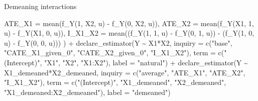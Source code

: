 \documentclass[
  11pt,
  ignorenonframetext,
]{beamer}
\newenvironment{Shaded}{\begin{snugshade}}{\end{snugshade}}
\newcommand{\AttributeTok}[1]{\textcolor[rgb]{0.40,0.45,0.13}{#1}}
\newcommand{\DecValTok}[1]{\textcolor[rgb]{0.68,0.00,0.00}{#1}}
\newcommand{\FunctionTok}[1]{\textcolor[rgb]{0.28,0.35,0.67}{#1}}
\newcommand{\NormalTok}[1]{\textcolor[rgb]{0.00,0.23,0.31}{#1}}
\newcommand{\SpecialCharTok}[1]{\textcolor[rgb]{0.37,0.37,0.37}{#1}}
\newcommand{\StringTok}[1]{\textcolor[rgb]{0.13,0.47,0.30}{#1}}
\begin{document}
\begin{frame}[fragile]{Demeaning interactions}
\begin{Shaded}
\begin{Highlighting}[]
    \AttributeTok{ATE\_X1 =} \FunctionTok{mean}\NormalTok{(}\FunctionTok{f\_Y}\NormalTok{(}\DecValTok{1}\NormalTok{, X2, u) }\SpecialCharTok{{-}} \FunctionTok{f\_Y}\NormalTok{(}\DecValTok{0}\NormalTok{, X2, u)),}
    \AttributeTok{ATE\_X2 =} \FunctionTok{mean}\NormalTok{(}\FunctionTok{f\_Y}\NormalTok{(X1, }\DecValTok{1}\NormalTok{, u) }\SpecialCharTok{{-}} \FunctionTok{f\_Y}\NormalTok{(X1, }\DecValTok{0}\NormalTok{, u)),}
    \AttributeTok{I\_X1\_X2 =} \FunctionTok{mean}\NormalTok{((}\FunctionTok{f\_Y}\NormalTok{(}\DecValTok{1}\NormalTok{, }\DecValTok{1}\NormalTok{, u) }\SpecialCharTok{{-}} \FunctionTok{f\_Y}\NormalTok{(}\DecValTok{0}\NormalTok{, }\DecValTok{1}\NormalTok{, u)) }\SpecialCharTok{{-}}\NormalTok{ (}\FunctionTok{f\_Y}\NormalTok{(}\DecValTok{1}\NormalTok{, }\DecValTok{0}\NormalTok{, u) }\SpecialCharTok{{-}} \FunctionTok{f\_Y}\NormalTok{(}\DecValTok{0}\NormalTok{, }\DecValTok{0}\NormalTok{, u)))}
\NormalTok{  ) }\SpecialCharTok{+}
  \FunctionTok{declare\_estimator}\NormalTok{(Y }\SpecialCharTok{\textasciitilde{}}\NormalTok{ X1}\SpecialCharTok{*}\NormalTok{X2, }
                    \AttributeTok{inquiry =} \FunctionTok{c}\NormalTok{(}\StringTok{"base"}\NormalTok{, }\StringTok{"CATE\_X1\_given\_0"}\NormalTok{, }\StringTok{"CATE\_X2\_given\_0"}\NormalTok{, }\StringTok{"I\_X1\_X2"}\NormalTok{), }
                    \AttributeTok{term =} \FunctionTok{c}\NormalTok{(}\StringTok{"(Intercept)"}\NormalTok{, }\StringTok{"X1"}\NormalTok{, }\StringTok{"X2"}\NormalTok{, }\StringTok{"X1:X2"}\NormalTok{),}
                    \AttributeTok{label =} \StringTok{"natural"}\NormalTok{) }\SpecialCharTok{+}
  \FunctionTok{declare\_estimator}\NormalTok{(Y }\SpecialCharTok{\textasciitilde{}}\NormalTok{ X1\_demeaned}\SpecialCharTok{*}\NormalTok{X2\_demeaned, }
                    \AttributeTok{inquiry =} \FunctionTok{c}\NormalTok{(}\StringTok{"average"}\NormalTok{, }\StringTok{"ATE\_X1"}\NormalTok{, }\StringTok{"ATE\_X2"}\NormalTok{, }\StringTok{"I\_X1\_X2"}\NormalTok{), }
                    \AttributeTok{term =} \FunctionTok{c}\NormalTok{(}\StringTok{"(Intercept)"}\NormalTok{, }\StringTok{"X1\_demeaned"}\NormalTok{, }\StringTok{"X2\_demeaned"}\NormalTok{, }\StringTok{"X1\_demeaned:X2\_demeaned"}\NormalTok{),}
                    \AttributeTok{label =} \StringTok{"demeaned"}\NormalTok{)}
\end{Highlighting}
\end{Shaded}
\end{frame}
\end{document}
